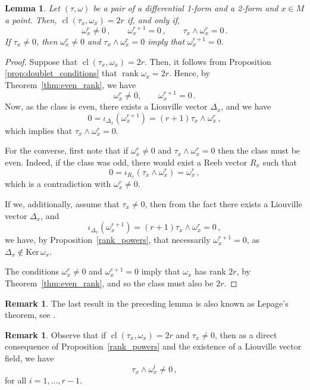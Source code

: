 \documentclass[11pt,twoside]{article}
\theoremstyle{plain}
\newtheorem{lemma}[theorem]{Lemma}
\theoremstyle{definition}
\newtheorem{remark}[theorem]{Remark}
\newcommand*{\inn}[1]{\iota_{#1}}
\DeclareMathOperator{\rk}{rank}
\DeclareMathOperator{\cl}{cl}
\def\Ker{\mathrm{Ker \,}}
\begin{document}
\begin{lemma}\label{lem:lepage}
    Let $(\tau,\omega)$ be a pair of a differential 1-form and a 2-form and $x\in M$ a point.
Then, $\cl (\tau_x,\omega_x) =2r$ if, and only if,
\begin{equation}
    \omega_x^{r}\neq 0\,, 
            \qquad
            \omega_x^{r+1}=0\,,\qquad 
            \tau_x \wedge \omega_x^r =0\,.
    \end{equation}
If $\tau_x\neq 0$, then $\omega_x^{r}\neq 0$ and $\tau_x \wedge \omega_x^r =0$ imply that $\omega_x^{r+1}=0$.
\end{lemma}
\begin{proof}
Suppose that $\cl(\tau_x,\omega_x)=2r$. 
Then, it follows from Proposition \ref{prop:doublet_conditions} that 
$\rk \omega_x=2r$. 
Hence, by Theorem~\ref{thm:even_rank}, we have
    $$\omega_x^{r}\neq 0, \qquad
            \omega_x ^{r+1} = 0\,.$$
Now, as the class is even, there exists a Liouville vector $\Delta_x$, and we have
    $$0=\inn{\Delta_x} (\omega_x^{r+1})= (r+1)\tau_x\wedge\omega_x^r\,,$$
which implies that $\tau_x\wedge \omega_x^r=0$.

For the converse,
first note that if $\omega^r_x\neq0$ and $\tau_x \wedge \omega^r_x=0$ then the class must be even. Indeed, if the class was odd, there would exist a Reeb vector $R_x$ such that
$$
0=\inn{R_x} (\tau_x \wedge \omega_x ^r)=\omega_x^r\,,
$$
which is a contradiction with $\omega_x^r\neq0$. 

If we, additionally, assume that $\tau_x\neq 0$, then from the fact there exists a Liouville vector $\Delta_x$, and
$$
\inn{\Delta_x} (\omega_x^{r+1})= (r+1)\tau_x\wedge\omega_x^r=0\,,
$$
we have, by Proposition~\ref{rank_powers},
that necessarily $\omega_x^{r+1}=0$, as $\Delta_x \notin \Ker \omega_x$. 


The conditions $\omega_x^r\neq 0$ and $\omega_x^{r+1}=0$ imply that $\omega_x$ has rank $2r$, by Theorem~\ref{thm:even_rank}, and so the class must also be $2r$.



% 
\end{proof}


\begin{remark}
  The last result in the preceding lemma is also known as Lepage's theorem, see \cite[Prop.\,2.5]{LM_1987}.  
\end{remark}


\begin{remark}
    Observe that if $\cl(\tau_x,\omega_x)=2r$ and $\tau_x\neq 0$, then as a direct consequence of Proposition~\ref{rank_powers} and the existence of a Liouville vector field, we have
    $$\tau_x \wedge \omega_x ^i \neq 0\,,$$
    for all $i=1,\dotsc, r-1$.
\end{remark}
\end{document}
